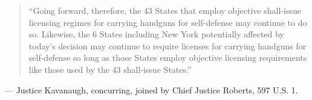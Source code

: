 \documentclass[12pt]{article}
\begin{document}
\begin{quote}
``Going forward, therefore, the 43 States that employ objective shall-issue licensing regimes for carrying handguns for self-defense may continue to do so. Likewise, the 6 States including New York potentially affected by today's decision may continue to require licenses for carrying handguns for self-defense so long as those States employ objective licensing requirements like those used by the 43 shall-issue States.''
\end{quote}
\noindent --- Justice Kavanaugh, concurring, joined by Chief Justice Roberts, 597 U.S. 1.
\end{document}
